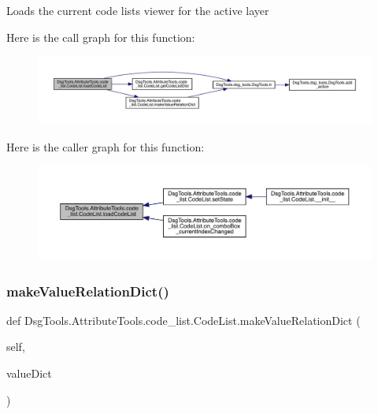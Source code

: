 \begin{DoxyVerb}Loads the current code lists viewer for the active layer
\end{DoxyVerb}
 Here is the call graph for this function\+:
\nopagebreak
\begin{figure}[H]
\begin{center}
\leavevmode
\includegraphics[width=350pt]{class_dsg_tools_1_1_attribute_tools_1_1code__list_1_1_code_list_a64dfeb9a4e4a4930377640ad21f9f7d2_cgraph}
\end{center}
\end{figure}
Here is the caller graph for this function\+:
\nopagebreak
\begin{figure}[H]
\begin{center}
\leavevmode
\includegraphics[width=350pt]{class_dsg_tools_1_1_attribute_tools_1_1code__list_1_1_code_list_a64dfeb9a4e4a4930377640ad21f9f7d2_icgraph}
\end{center}
\end{figure}
\mbox{\label{class_dsg_tools_1_1_attribute_tools_1_1code__list_1_1_code_list_aa6d24b65dfba750135e6f85d7c47e431}} 
\subsubsection{\texorpdfstring{make\+Value\+Relation\+Dict()}{makeValueRelationDict()}}
{\footnotesize\ttfamily def Dsg\+Tools.\+Attribute\+Tools.\+code\+\_\+list.\+Code\+List.\+make\+Value\+Relation\+Dict (\begin{DoxyParamCaption}\item[{}]{self,  }\item[{}]{value\+Dict }\end{DoxyParamCaption})}

